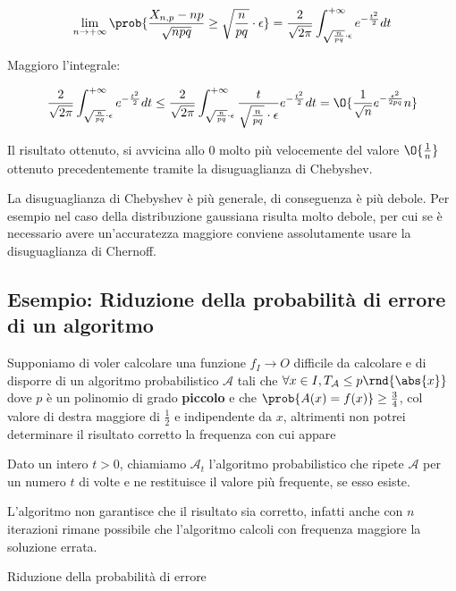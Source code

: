 \documentclass[\main/main.tex]{subfiles}
\begin{document}
\[
  \lim_{n\rightarrow+\infty} \prob{\frac{X_{n,p} - np}{\sqrt{npq}}\geq \sqrt{\frac{n}{pq}}\cdot \epsilon} = \frac{2}{\sqrt{2\pi}} \int_{\sqrt{\frac{n}{pq}}\cdot \epsilon}^{+\infty} e^{-\frac{t^2}{2}} dt
\]

Maggioro l'integrale:

\[
  \frac{2}{\sqrt{2\pi}} \int_{\sqrt{\frac{n}{pq}}\cdot \epsilon}^{+\infty} e^{-\frac{t^2}{2}} dt \leq \frac{2}{\sqrt{2\pi}} \int_{\sqrt{\frac{n}{pq}}\cdot \epsilon}^{+\infty} \frac{t}{\sqrt{\frac{n}{pq}}\cdot \epsilon}e^{-\frac{t^2}{2}} dt = \O{\frac{1}{\sqrt{n}} e^{-\frac{\epsilon^2}{2pq}}n}
\]

Il risultato ottenuto, si avvicina allo \(0\) molto più velocemente del valore \(\O{\frac{1}{n}}\) ottenuto precedentemente tramite la disuguaglianza di Chebyshev.

La disuguaglianza di Chebyshev è più generale, di conseguenza è più debole. Per esempio nel caso della distribuzione gaussiana risulta molto debole, per cui se è necessario avere un'accuratezza maggiore conviene assolutamente usare la disuguaglianza di Chernoff.

\subsection{Esempio: Riduzione della probabilità di errore di un algoritmo}
Supponiamo di voler calcolare una funzione \(f_ I \rightarrow O\) difficile da calcolare e di disporre di un algoritmo probabilistico \(\mathcal{A}\) tali che \(\forall x \in I, T_{\mathcal{A}} \leq p\rnd{\abs{x}}\) dove \(p\) è un polinomio di grado \textbf{piccolo} e che \(\prob{A(x) = f(x)} \geq \frac{3}{4}\), col valore di destra maggiore di \(\frac{1}{2}\) e indipendente da \(x\), altrimenti non potrei determinare il risultato corretto la frequenza con cui appare

Dato un intero \(t > 0\), chiamiamo \(\mathcal{A}_t\) l'algoritmo probabilistico che ripete \(\mathcal{A}\) per un numero \(t\) di volte e ne restituisce il valore più frequente, se esso esiste.

L'algoritmo non garantisce che il risultato sia corretto, infatti anche con \(n\) iterazioni rimane possibile che l'algoritmo calcoli con frequenza maggiore la soluzione errata.

\IncMargin{1em}
\begin{algorithm}
  \BlankLine
  \caption{Riduzione della probabilità di errore}\label{algo_disjdecomp}
\end{algorithm}\DecMargin{1em}
\end{document}
